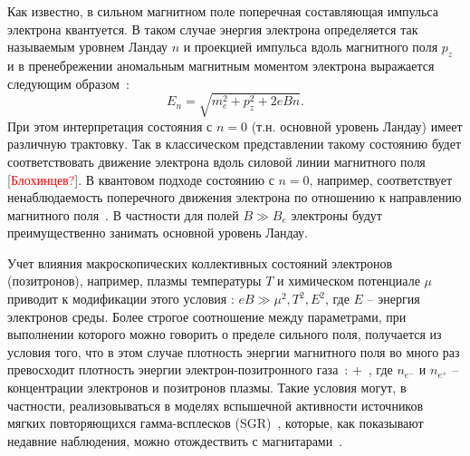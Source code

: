 Как известно, в сильном магнитном поле поперечная составляющая импульса электрона квантуется. В таком случае энергия электрона определяется так называемым уровнем Ландау $n$ и проекцией импульса вдоль магнитного поля $p_z$ и в пренебрежении аномальным магнитным моментом электрона выражается следующим образом~\cite{Sokolov:1968}: 
\begin{equation}
E_n = \sqrt{m_e^2+p_z^2+2 e B n}.
\end{equation}
%
При этом интерпретация состояния с $n=0$ (т.н. основной уровень Ландау) имеет различную трактовку. Так в классическом представлении такому состоянию будет соответствовать движение электрона вдоль силовой линии магнитного поля [\textcolor{red}{Блохинцев?}]. В квантовом подходе состоянию с $n=0$, например, соответствует ненаблюдаемость поперечного движения электрона по отношению к направлению магнитного поля~\cite{KM_Book_2013}. В частности для полей $B\gg B_e$ электроны будут преимущественно занимать основной уровень Ландау. 

Учет влияния макроскопических коллективных состояний электронов (позитронов), например, плазмы температуры $T$ и химическом потенциале $\mu$ приводит к модификации этого условия \cite{Borisov:1997}: $eB \gg \mu^2, T^2, E^2$, где $E$ -- энергия электронов среды. Более строгое соотношение между параметрами, при выполнении которого можно говорить о пределе сильного поля, получается из условия того, что в этом случае плотность энергии магнитного поля во много раз превосходит плотность энергии электрон-позитронного газа~\cite{KuzMih:2000}: 
%
\beq
\label{bigB}
 \gg {} + \,,
\eeq 
%
\noindent где $n_{e^{-}}$ и $n_{e^{+}}$ -- концентрации электронов и позитронов плазмы. Такие условия могут, в частности, реализовываться в моделях вспышечной активности источников мягких повторяющихся гамма-всплесков 
(SGR)~\cite{Duncan:1995, Bisnovatyi:1979}, которые, как показывают недавние наблюдения, можно отождествить с магнитарами~\cite{Kouveliotou:1998ze,Kouveliotou:1998fd,Gavriil:2002mc,Ibrahim:2002zw,Ibrahim:2002zy,Olausen:2014}.


